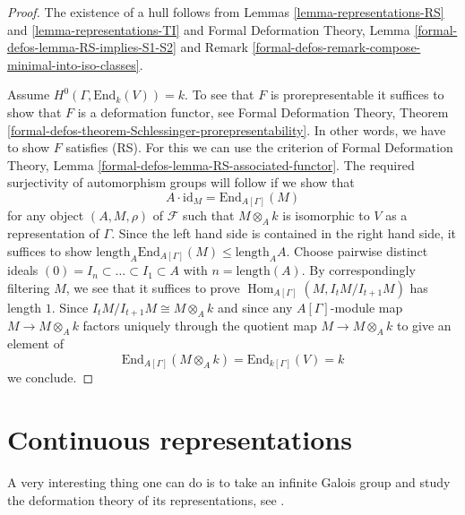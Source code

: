 \documentclass{stacks-project}
\theoremstyle{plain}
\theoremstyle{definition}
\theoremstyle{remark}
\numberwithin{equation}{subsection}
\def\Hom{\mathop{\mathrm{Hom}}\nolimits}
\begin{document}
\begin{proof}
The existence of a hull follows from Lemmas \ref{lemma-representations-RS} and
\ref{lemma-representations-TI} and
Formal Deformation Theory, Lemma \ref{formal-defos-lemma-RS-implies-S1-S2}
and Remark \ref{formal-defos-remark-compose-minimal-into-iso-classes}.

\medskip\noindent
Assume $H^0(\Gamma, \text{End}_k(V)) = k$. To see that $F$
is prorepresentable it suffices to show that $F$ is a
deformation functor, see Formal Deformation Theory, Theorem
\ref{formal-defos-theorem-Schlessinger-prorepresentability}.
In other words, we have to show $F$ satisfies (RS).
For this we can use the criterion of Formal Deformation Theory, Lemma
\ref{formal-defos-lemma-RS-associated-functor}.
The required surjectivity of automorphism groups will follow if we
show that
$$
A \cdot \text{id}_M =
\text{End}_{A[\Gamma]}(M)
$$
for any object $(A, M, \rho)$ of $\mathcal{F}$ such that
$M \otimes_A k$ is isomorphic to $V$ as a representation of $\Gamma$.
Since the left hand side is contained in the right hand side,
it suffices to show
$\text{length}_A \text{End}_{A[\Gamma]}(M) \leq \text{length}_A A$.
Choose pairwise distinct ideals
$(0) = I_n \subset \ldots \subset I_1 \subset A$
with $n = \text{length}(A)$. By correspondingly filtering
$M$, we see that it suffices to prove $\Hom_{A[\Gamma]}(M, I_tM/I_{t + 1}M)$
has length $1$. Since $I_tM/I_{t + 1}M \cong M \otimes_A k$
and since any $A[\Gamma]$-module map $M \to M \otimes_A k$ factors
uniquely through the quotient map $M \to M \otimes_A k$
to give an element of
$$
\text{End}_{A[\Gamma]}(M \otimes_A k) = \text{End}_{k[\Gamma]}(V) = k
$$
we conclude.
\end{proof}



\section{Continuous representations}
\label{section-continuous-representations}

\noindent
A very interesting thing one can do is to take an infinite Galois
group and study the deformation theory of its representations, see
\cite{Mazur-deforming}.
\end{document}
